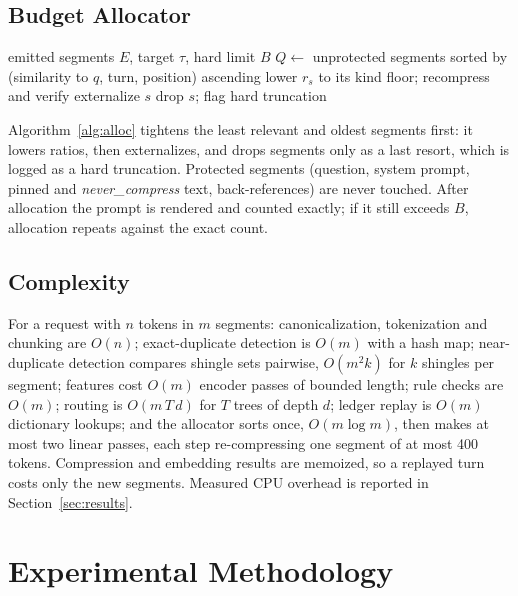 \documentclass[journal]{IEEEtran}
\begin{document}
\subsection{Budget Allocator}\label{sec:budget}
\begin{algorithm}[t]\caption{Greedy budget allocation}\label{alg:alloc}\small
\begin{algorithmic}[1]
\Require emitted segments $E$, target $\tau$, hard limit $B$
\State $Q\gets$ unprotected segments sorted by (similarity to $q$, turn, position) ascending
 lower $r_s$ to its kind floor; recompress and verify \EndFor
{}  externalize $s$ \EndIf \EndFor
{} drop $s$; flag hard truncation \EndFor
\end{algorithmic}\end{algorithm}
Algorithm~\ref{alg:alloc} tightens the least relevant and oldest segments first: it lowers ratios, then externalizes, and drops
segments only as a last resort, which is logged as a hard truncation. Protected segments (question, system prompt, pinned and
\textit{never\_compress} text, back-references) are never touched. After allocation the prompt is rendered and counted exactly; if
it still exceeds $B$, allocation repeats against the exact count.

\subsection{Complexity}
For a request with $n$ tokens in $m$ segments: canonicalization, tokenization and chunking are $O(n)$; exact-duplicate detection is
$O(m)$ with a hash map; near-duplicate detection compares shingle sets pairwise, $O(m^2 k)$ for $k$ shingles per segment; features
cost $O(m)$ encoder passes of bounded length; rule checks are $O(m)$; routing is $O(m\,T\,d)$ for $T$ trees of depth $d$; ledger
replay is $O(m)$ dictionary lookups; and the allocator sorts once, $O(m\log m)$, then makes at most two linear passes, each step
re-compressing one segment of at most 400 tokens. Compression and embedding results are memoized, so a replayed turn costs
only the new segments. Measured CPU overhead is reported in Section~\ref{sec:results}.

\section{Experimental Methodology}\label{sec:exp}
\end{document}
